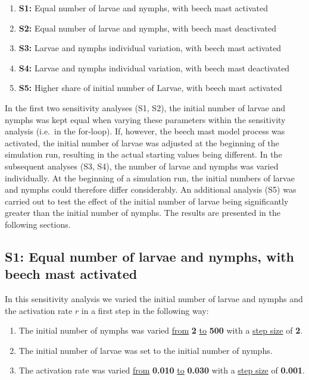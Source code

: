 \documentclass[a4paper, 11pt]{scrartcl}
\begin{document}
\begin{enumerate}
\item[] \textbf{S1:} Equal number of larvae and nymphs, with beech mast activated
\item[] \textbf{S2:} Equal number of larvae and nymphs, with beech mast deactivated
\item[] \textbf{S3:} Larvae and nymphs individual variation, with beech mast activated
\item[] \textbf{S4:} Larvae and nymphs individual variation, with beech mast deactivated
\item[] \textbf{S5:} Higher share of initial number of Larvae, with beech mast activated
\end{enumerate}

In the first two sensitivity analyses (S1, S2), the initial number of larvae and nymphs was kept equal when varying these parameters within the sensitivity analysis (i.e.\ in the for-loop). If, however, the beech mast model process was activated, the initial number of larvae was adjusted at the beginning of the simulation run, resulting in the actual starting values being different. In the subsequent analyses (S3, S4), the number of larvae and nymphs was varied individually. At the beginning of a simulation run, the initial numbers of larvae and nymphs could therefore differ considerably. An additional analysis (S5) was carried out to test the effect of the initial number of larvae being significantly greater than the initial number of nymphs. The results are presented in the following sections.


\newpage
\subsection{S1: Equal number of larvae and nymphs, with beech mast activated}
In this sensitivity analysis we varied the initial number of larvae and nymphs and the activation rate $r$ in a first step in the following way:

\begin{enumerate}
\item The initial number of nymphs was varied \underline{from} \textbf{2} \underline{to} \textbf{500} with a \underline{step size} of \textbf{2}.
\item The initial number of larvae was set to the initial number of nymphs.
\item The activation rate was varied \underline{from} \textbf{0.010} \underline{to} \textbf{0.030} with a \underline{step size} of \textbf{0.001}.
\end{enumerate}
\end{document}
